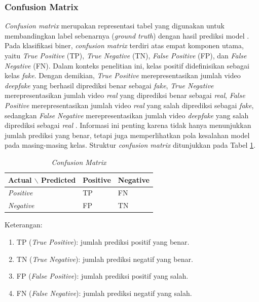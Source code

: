 \subsubsection{Confusion Matrix} \label{II.Teori7.1}
\textit{Confusion matrix} merupakan representasi tabel yang digunakan untuk membandingkan label sebenarnya (\textit{ground truth}) dengan hasil prediksi model \cite{SOKOLOVA2009427}. Pada klasifikasi biner, \textit{confusion matrix} terdiri atas empat komponen utama, yaitu \textit{True Positive} (TP), \textit{True Negative} (TN), \textit{False Positive} (FP), dan \textit{False Negative} (FN). Dalam konteks penelitian ini, kelas positif didefinisikan sebagai kelas \textit{fake}. Dengan demikian, \textit{True Positive} merepresentasikan jumlah video \textit{deepfake} yang berhasil diprediksi benar sebagai \textit{fake}, \textit{True Negative} merepresentasikan jumlah video \textit{real} yang diprediksi benar sebagai \textit{real}, \textit{False Positive} merepresentasikan jumlah video \textit{real} yang salah diprediksi sebagai \textit{fake}, sedangkan \textit{False Negative} merepresentasikan jumlah video \textit{deepfake} yang salah diprediksi sebagai \textit{real} \cite{SOKOLOVA2009427,powers2020evaluationprecisionrecallfmeasure}. Informasi ini penting karena tidak hanya menunjukkan jumlah prediksi yang benar, tetapi juga memperlihatkan pola kesalahan model pada masing-masing kelas. Struktur \textit{confusion matrix} ditunjukkan pada Tabel \ref{tab:confusion-matrix}. \par

\begin{table}[htbp]
	\centering
	\caption{\textit{Confusion Matrix}}
	\label{tab:confusion-matrix}
	\begin{tabular}{|>{\centering\arraybackslash}p{}|>{\centering\arraybackslash}p{}|>{\centering\arraybackslash}p{}|}
		\hline
		\textbf{Actual} $\backslash$ \textbf{Predicted} & \textbf{Positive} & \textbf{Negative} \\
		\hline
		\textit{Positive} & TP & FN \\
		\hline
		\textit{Negative} & FP & TN \\
		\hline
	\end{tabular}
\end{table}

Keterangan:
\begin{enumerate}[label=\alph*., noitemsep]
	\item TP (\textit{True Positive}): jumlah prediksi positif yang benar.
	\item TN (\textit{True Negative}): jumlah prediksi negatif yang benar.
	\item FP (\textit{False Positive}): jumlah prediksi positif yang salah.
	\item FN (\textit{False Negative}): jumlah prediksi negatif yang salah.
\end{enumerate}
\par

